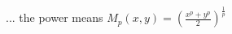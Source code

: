 \documentclass{article}
\begin{document}
... the power means $M_p(x,y)=\left(\frac{x^p+y^p}{2}\right)^{\frac{1}{p}}$
\end{document}
